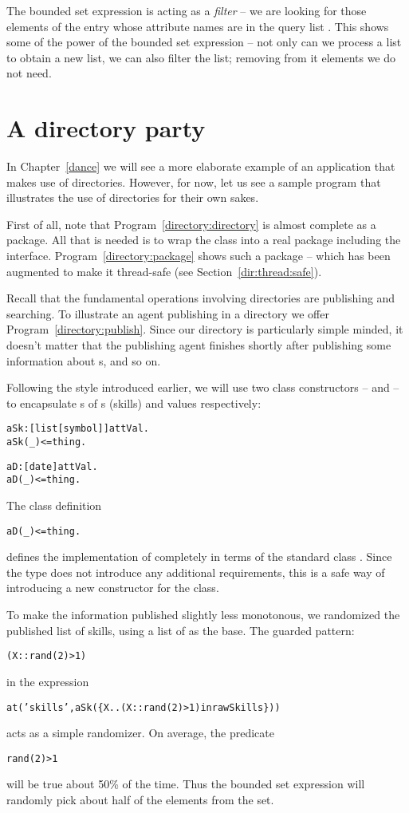 The  bounded set expression is acting as a \emph{filter} -- we are looking for those elements of the entry  whose attribute names are in the query list . This shows some of the power of the bounded set expression -- not only can we process a list to obtain a new list, we can also filter the list; removing from it elements we do not need.

\section{A directory party}
In Chapter~\vref{dance} we will see a more elaborate example of an application that makes use of directories. However, for now, let us see a sample program that illustrates the use of directories for their own sakes. 

First of all, note that Program~\vref{directory:directory} is almost complete as a package. All that is needed is to wrap the  class into a real package including the  interface.  Program~\vref{directory:package} shows such a package -- which has been augmented to make it thread-safe (see Section~\vref{dir:thread:safe}).

Recall that the fundamental operations involving directories are publishing and searching. To illustrate an agent publishing in a directory we offer Program~\vref{directory:publish}. Since our directory is particularly simple minded, it doesn't matter that the publishing agent finishes shortly after publishing some information about s,  and so on.

Following the style introduced earlier, we will use two class constructors --  and  -- to encapsulate s of s (skills) and  values respectively:
\begin{alltt}
aSk:[list[symbol]]\conarrow{}attVal.
aSk(_) <= thing.

aD:[date]\conarrow{}attVal.
aD(_)<=thing.
\end{alltt}
The class definition
\begin{alltt}
aD(_) <= thing.
\end{alltt}
defines the implementation of  completely in terms of the standard class . Since the  type does not introduce any additional requirements, this is a safe way of introducing a new constructor for the  class.

To make the information published slightly less monotonous, we randomized the published list of skills, using a list of  as the base. The  guarded pattern:
\begin{alltt}
(X::rand(2)>1)
\end{alltt}
in the expression
\begin{alltt}
at('skills',aSk(\{X .. (X::rand(2)>1) in rawSkills\}))
\end{alltt}
acts as a simple randomizer. On average, the predicate 
\begin{alltt}
rand(2)>1
\end{alltt}
will be true about 50\% of the time. Thus the bounded set expression will randomly pick about half of the elements from the  set.

